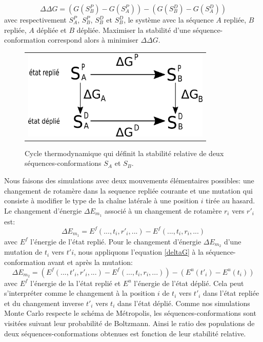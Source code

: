 \begin{equation}
  \label{deltaG}
\Delta \Delta G = (G(S^P_B)- G(S^P_A)) - (G(S^D_B)- G(S^D_A))
\end{equation}  
avec respectivement $S^P_A$, $S^P_B$, $S^D_B$ et $S^D_B$, le système avec la séquence $A$ repliée, $B$ repliée, $A$ dépliée et $B$ dépliée. Maximiser la stabilité d'une séquence-conformation correspond alors à minimiser $\Delta \Delta G$.

   \begin{figure}[!htbp]
     \centering
     \begin{tabular}{c}
       \includegraphics[width=9cm]{figure/cycleThermo.png} \\
     \end{tabular}
     
     \caption{Cycle thermodynamique qui définit la stabilité relative de deux séquences-conformations $S_A$ et $S_B$.}
\label{fig:cycleThermo}
   \end{figure}


Nous faisons des simulations avec deux mouvements élémentaires possibles: une changement de rotamère dans la sequence repliée courante et une mutation qui consiste à modifier le type de la chaîne latérale à une position $i$ tirée au hasard. Le changement d'énergie $\Delta E_{m_1}$ associé à un changement de rotamère $r_i$ vers $r'_i$ est:
\begin{equation}
\Delta E_{m_1}= E^f(...,t_i,r'_i,...) - E^f(...,t_i,r_i,...)     
\end{equation}   
avec $E^f$ l'énergie de l'état replié. Pour le changement d'énergie $\Delta E_{m_2}$ d'une mutation de $t_i$ vers $t'i$, nous appliquons l'equation \ref{deltaG} à la séquence-conformation avant et après la mutation:    
\begin{equation}
\Delta E_{m_2}= (E^f(...,t'_i,r'_i,...) - E^f(...,t_i,r_i,...)) - (E^u(t'_i) - E^u(t_i))     
\end{equation}   
avec $E^f$ l'énergie de la l'état replié et $E^u$ l'énergie de l'état déplié. Cela peut s'interpréter comme le changement à la position $i$ de $t_i$ vers $t'_i$ dans l'état repliée et du changement inverse $t'_i$ vers $t_i$ dans l'état déplié. Comme nos simulations Monte Carlo respecte le schéma de Métropolis, les séquences-conformations sont visitées suivant leur probabilité de Boltzmann. Ainsi le ratio des populations de deux séquences-conformations obtenues est fonction de leur stabilité relative. 
   

